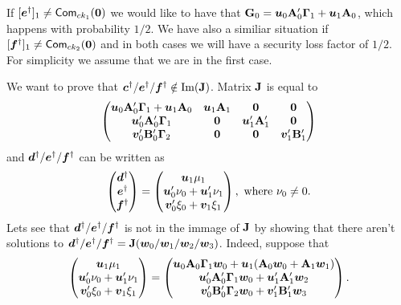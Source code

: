 If $[{\boldsymbol{e}}^\dag]_1 \neq\mathsf{Com}_{ck_1}({\boldsymbol{0}})$ we would like to have that $\mathbf{{G}}_0 = {\boldsymbol{u}}_0\mathbf{{A}}'_0\mathbf{{\Gamma}}_1 + {\boldsymbol{u}}_1\mathbf{{A}}_0$, which happens with probability $1/2$. We have also a similiar situation if $[{\boldsymbol{f}}^\dag]_1 \neq\mathsf{Com}_{ck_2}({\boldsymbol{0}})$ and in both cases we will have a security loss factor of $1/2$. For simplicity we assume that we are in the first case.

We want to prove that ${\boldsymbol{c}}^\dag/{\boldsymbol{e}}^\dag/{\boldsymbol{f}}^\dag\notin\mathrm{Im}(\mathbf{{J}})$. Matrix $\mathbf{{J}}$ is equal to
$$
\begin{pmatrix}
{\boldsymbol{u}}_{0}\mathbf{{A}}'_0\mathbf{{\Gamma}}_1 + {\boldsymbol{u}}_1\mathbf{{A}}_0 & {\boldsymbol{u}}_{1}\mathbf{{A}}_1 & \mathbf{{0}} & \mathbf{{0}} \\
{\boldsymbol{u}}'_0\mathbf{{A}}'_0\mathbf{{\Gamma}}_1  & \mathbf{{0}} & {\boldsymbol{u}}'_1\mathbf{{A}}'_1 & \mathbf{{0}} \\
{\boldsymbol{v}}'_0\mathbf{{B}}'_0\mathbf{{\Gamma}}_2  & \mathbf{{0}} & \mathbf{{0}} & {\boldsymbol{v}}'_1\mathbf{{B}}'_1
\end{pmatrix}
$$
and ${\boldsymbol{d}}^\dag/{\boldsymbol{e}}^\dag/{\boldsymbol{f}}^\dag$ can be written as
$$
\begin{pmatrix} {\boldsymbol{d}}^\dag\\ {\boldsymbol{e}}^\dag \\ {\boldsymbol{f}}^\dag\end{pmatrix}
=
\begin{pmatrix}
{\boldsymbol{u}}_{1}\mu_{1} \\
{\boldsymbol{u}}'_{0}\nu_{0} + {\boldsymbol{u}}'_1\nu_1\\
{\boldsymbol{v}}'_0\xi_0 + {\boldsymbol{v}}_1\xi_1
\end{pmatrix},
\text{ where } \nu_0 \neq 0.
$$
Lets see that ${\boldsymbol{d}}^\dag/{\boldsymbol{e}}^\dag/{\boldsymbol{f}}^\dag$ is not in the immage of $\mathbf{{J}}$ by showing that there aren't solutions to ${\boldsymbol{d}}^\dag/{\boldsymbol{e}}^\dag/{\boldsymbol{f}}^\dag=\mathbf{{J}}({\boldsymbol{w}}_{0}/{\boldsymbol{w}}_{1}/{\boldsymbol{w}}_{2}/{\boldsymbol{w}}_{3})$. Indeed, suppose that
\begin{align}
\begin{pmatrix}
{\boldsymbol{u}}_{1}\mu_{1} \\
{\boldsymbol{u}}'_{0}\nu_{0} + {\boldsymbol{u}}'_1\nu_1\\
{\boldsymbol{v}}'_0\xi_0 + {\boldsymbol{v}}_1\xi_1
\end{pmatrix}
=
\begin{pmatrix}
{\boldsymbol{u}}_0\mathbf{{A}}_0\mathbf{{\Gamma}}_1{\boldsymbol{w}}_0 + {\boldsymbol{u}}_1(\mathbf{{A}}_0{\boldsymbol{w}}_0 + \mathbf{{A}}_1{\boldsymbol{w}}_1)\\
{\boldsymbol{u}}'_0\mathbf{{A}}'_0\mathbf{{\Gamma}}_1{\boldsymbol{w}}_0 + {\boldsymbol{u}}'_1\mathbf{{A}}'_1{\boldsymbol{w}}_{2}\\
{\boldsymbol{v}}'_0\mathbf{{B}}'_0\mathbf{{\Gamma}}_2{\boldsymbol{w}}_0 + {\boldsymbol{v}}'_1\mathbf{{B}}'_1{\boldsymbol{w}}_{3}
\end{pmatrix}.
\label{eq:def-li}
\end{align}
